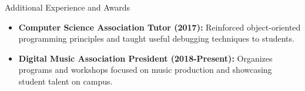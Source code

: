 \documentclass[]{johnsoncv}
\begin{document}
	\begin{cvsection}{Additional Experience and Awards}
		\begin{cvsubsection}{}{}{}	
			\begin{itemize}
				\item \textbf{Computer Science Association Tutor (2017):} Reinforced object-oriented programming principles and taught useful debugging techniques to students.
				\item \textbf{Digital Music Association President (2018-Present):} Organizes programs and workshops focused on music production and showcasing student talent on campus.
			\end{itemize}
		\end{cvsubsection}
	\end{cvsection}


	
	
	
\end{document}
